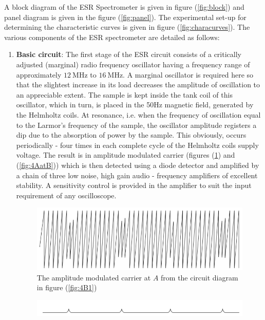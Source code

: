 \documentclass[%
 reprint,
nofootinbib,
 amsmath,amssymb,
 aps,
floatfix,
]{revtex4-2}
\begin{document}
    A block diagram of the ESR Spectrometer is given in figure (\ref{fig:block}) and panel diagram is given in the figure (\ref{fig:panel}). The experimental set-up for determining the characteristic curves is given in figure (\ref{fig:characurves}). The various components of the ESR spectrometer are detailed as follows:
    \begin{enumerate}
        \item \textbf{Basic circuit}: The first stage of the ESR circuit consists of a critically adjusted (marginal) radio frequency oscillator having a frequency range of approximately $\SI{12}{\mega \hertz}$ to $\SI{16}{\mega \hertz}$. A marginal oscillator is required here so that the slightest increase in its load decreases the amplitude of oscillation to an appreciable extent. The sample is kept inside the tank coil of this oscillator, which in turn, is placed in the 50Hz magnetic field, generated by the Helmholtz coils. At resonance, i.e. when the frequency of oscillation equal to the Larmor's frequency of the sample, the oscillator amplitude registers a dip due to the absorption of power by the sample. This obviously, occurs periodically - four times in each complete cycle of the Helmholtz coils supply voltage. The result is in amplitude modulated carrier (figures (\ref{fig:4AatA}) and (\ref{fig:4AatB})) which is then detected using a diode detector and amplified by a chain of three low noise, high gain audio - frequency amplifiers of excellent stability. A sensitivity control is provided in the amplifier to suit the input requirement of any oscilloscope.
        \begin{figure}
            \centering
            \includegraphics[scale = 0.5]{Figures/fig4AatA.png}
            \caption{The amplitude modulated carrier at $A$ from the circuit diagram in figure (\ref{fig:4B1})}
            \label{fig:4AatA}
        \end{figure}
        \begin{figure}
            \centering
            \includegraphics[scale = 0.5]{Figures/fig4AatB.png}

\end{figure}
\end{enumerate}
\end{document}
